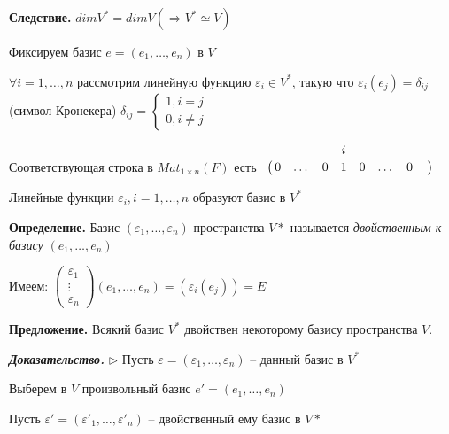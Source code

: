 \textbf{Следствие.} $dimV^* = dimV (\Rightarrow V^{*} \simeq V)$

\vspace{\baselineskip}
Фиксируем базис $e = (e_1, \dots, e_n)$ в $V$

$\forall i = 1, \dots, n$ рассмотрим линейную функцию $\varepsilon_i \in V^*$, такую что $\varepsilon_i(e_j) = \delta_{ij}$ (символ Кронекера) $\delta_{ij} = \begin{cases}
		1, i=j \\
		0, i \neq j
	\end{cases}$

\vspace{\baselineskip}
Соответствующая строка в $Mat_{1 \times n}(F)$ есть $
\bordermatrix{ 
& & & & i & & & &  \cr 
& 0 & \dots & 0 & 1 & 0 & \dots & 0} $

\vspace{\baselineskip}
Линейные функции $\varepsilon_i, i = 1, \dots, n$ образуют базис в $V^*$

\vspace{\baselineskip}
\textbf{Определение.} Базис $(\varepsilon_1, \dots, \varepsilon_n)$ пространства $V*$ называется \textit{двойственным к базису} $(e_1, \dots, e_n)$

Имеем: $\begin{pmatrix} \varepsilon_1 \\ \vdots \\ \varepsilon_n \end{pmatrix} (e_1, \dots, e_n) = (\varepsilon_i(e_j)) = E$

\vspace{\baselineskip}
\textbf{Предложение.} Всякий базис $V^*$ двойствен некоторому базису пространства $V$.

\vspace{\baselineskip}
\textbf{\textit{Доказательство.}} $\rhd$ Пусть $\varepsilon = (\varepsilon_1, \dots, \varepsilon_n)$ -- данный базис в $V^*$

Выберем в $V$ произвольный базис $e' = (e_1, \dots, e_n)$

Пусть $\varepsilon' = (\varepsilon'_1, \dots, \varepsilon'_n)$ -- двойственный ему базис в $V*$

